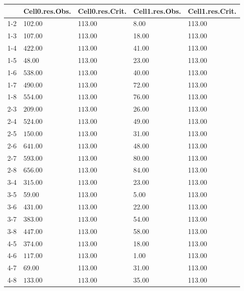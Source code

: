 \begin{table}[ht]
\centering
\begin{tabularx}{\textwidth}{rXXXX}
  \toprule
 & Cell0.res.Obs. & Cell0.res.Crit. & Cell1.res.Obs. & Cell1.res.Crit. \\ 
  \midrule
1-2 & 102.00 & 113.00 & 8.00 & 113.00 \\ 
  1-3 & 107.00 & 113.00 & 18.00 & 113.00 \\ 
  1-4 & \(\mathbf{422.00}\) & \(\mathbf{113.00}\) & 41.00 & 113.00 \\ 
  1-5 & 48.00 & 113.00 & 23.00 & 113.00 \\ 
  1-6 & \(\mathbf{538.00}\) & \(\mathbf{113.00}\) & 40.00 & 113.00 \\ 
  1-7 & \(\mathbf{490.00}\) & \(\mathbf{113.00}\) & 72.00 & 113.00 \\ 
  1-8 & \(\mathbf{554.00}\) & \(\mathbf{113.00}\) & 76.00 & 113.00 \\ 
   [1ex]2-3 & \(\mathbf{209.00}\) & \(\mathbf{113.00}\) & 26.00 & 113.00 \\ 
  2-4 & \(\mathbf{524.00}\) & \(\mathbf{113.00}\) & 49.00 & 113.00 \\ 
  2-5 & \(\mathbf{150.00}\) & \(\mathbf{113.00}\) & 31.00 & 113.00 \\ 
  2-6 & \(\mathbf{641.00}\) & \(\mathbf{113.00}\) & 48.00 & 113.00 \\ 
  2-7 & \(\mathbf{593.00}\) & \(\mathbf{113.00}\) & 80.00 & 113.00 \\ 
  2-8 & \(\mathbf{656.00}\) & \(\mathbf{113.00}\) & 84.00 & 113.00 \\ 
   [1ex]3-4 & \(\mathbf{315.00}\) & \(\mathbf{113.00}\) & 23.00 & 113.00 \\ 
  3-5 & 59.00 & 113.00 & 5.00 & 113.00 \\ 
  3-6 & \(\mathbf{431.00}\) & \(\mathbf{113.00}\) & 22.00 & 113.00 \\ 
  3-7 & \(\mathbf{383.00}\) & \(\mathbf{113.00}\) & 54.00 & 113.00 \\ 
  3-8 & \(\mathbf{447.00}\) & \(\mathbf{113.00}\) & 58.00 & 113.00 \\ 
   [1ex]4-5 & \(\mathbf{374.00}\) & \(\mathbf{113.00}\) & 18.00 & 113.00 \\ 
  4-6 & \(\mathbf{117.00}\) & \(\mathbf{113.00}\) & 1.00 & 113.00 \\ 
  4-7 & 69.00 & 113.00 & 31.00 & 113.00 \\ 
  4-8 & \(\mathbf{133.00}\) & \(\mathbf{113.00}\) & 35.00 & 113.00 \\ 

\end{tabularx}
\end{table}
